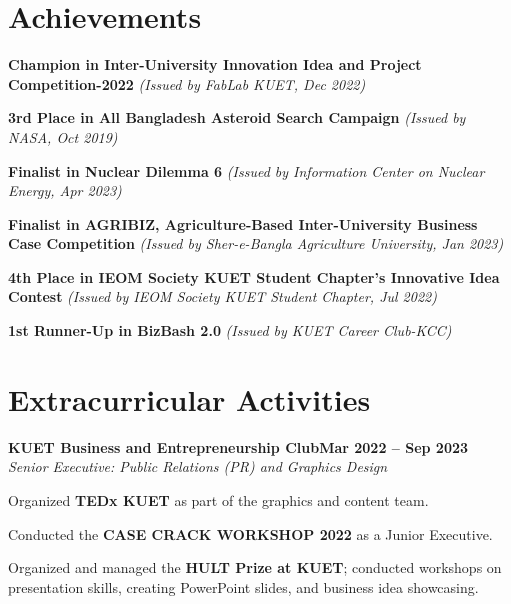 \documentclass[letterpaper,10pt]{article}
\newcommand{\heading}[2]{
  \hspace{10pt}#1\hfill#2\\
}
\newcommand{\headingBf}[2]{
  \heading{\textbf{#1}}{\textbf{#2}}
}
\newcommand{\headingIt}[2]{
  \heading{\textit{#1}}{\textit{#2}}
}
\newenvironment{resume_list}{
  \vspace{-7pt}
  \begin{itemize}[itemsep=-2px, parsep=1pt, leftmargin=30pt]
}{
  \end{itemize}
}
\begin{document}




  \section{Achievements}
    \vspace{5pt}
    
    \begin{resume_list}
    \item \textbf{Champion in Inter-University Innovation Idea and Project Competition-2022} \textit{(Issued by FabLab KUET, Dec 2022)}
    \item \textbf{3rd Place in All Bangladesh Asteroid Search Campaign} \textit{(Issued by NASA, Oct 2019)}
    \item \textbf{Finalist in Nuclear Dilemma 6} \textit{(Issued by Information Center on Nuclear Energy, Apr 2023)}
    \item \textbf{Finalist in AGRIBIZ, Agriculture-Based Inter-University Business Case Competition} \textit{(Issued by Sher-e-Bangla Agriculture University, Jan 2023)}
    \item \textbf{4th Place in IEOM Society KUET Student Chapter's Innovative Idea Contest} \textit{(Issued by IEOM Society KUET Student Chapter, Jul 2022)}
    \item \textbf{1st Runner-Up in BizBash 2.0} \textit{(Issued by KUET Career Club-KCC)}
  \end{resume_list}




 \section{Extracurricular Activities}

  
  \headingBf{KUET Business and Entrepreneurship Club}{Mar 2022 -- Sep 2023}
  \headingIt{Senior Executive: Public Relations (PR) and Graphics Design}{}
  \begin{resume_list}
    \item Organized \textbf{TEDx KUET} as part of the graphics and content team.
    \item Conducted the \textbf{CASE CRACK WORKSHOP 2022} as a Junior Executive.
    \item Organized and managed the \textbf{HULT Prize at KUET}; conducted workshops on presentation skills, creating PowerPoint slides, and business idea showcasing.
  \end{resume_list}
\end{document}

